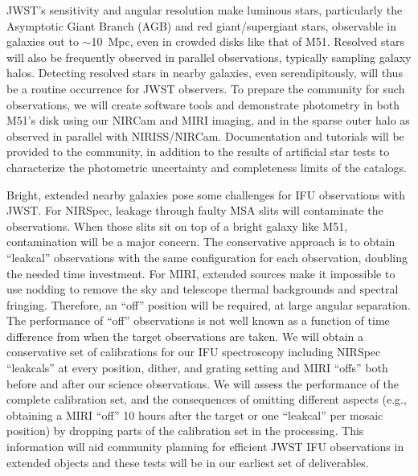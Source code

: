 \documentclass[12pt]{article}
\begin{document}
\vspace{0.05in} 

 JWST's sensitivity and angular resolution make luminous stars, particularly the Asymptotic Giant Branch (AGB) and red giant/supergiant stars, observable in galaxies out to $\sim$10~Mpc, even in crowded disks like that of M51.  Resolved stars will also be frequently observed in parallel observations, typically sampling galaxy halos. Detecting resolved stars in nearby galaxies, even serendipitously, will thus be a routine occurrence for JWST observers.  To prepare the community for  such observations, we will create software tools and demonstrate photometry in both M51's disk using our NIRCam and MIRI imaging, and in the sparse outer halo as observed in parallel with NIRISS/NIRCam.  Documentation and tutorials will be provided to the community, in addition to the results of artificial star tests to characterize the photometric uncertainty and completeness limits of the catalogs.

\vspace{0.05in} 

 Bright, extended nearby galaxies pose some challenges for IFU observations with JWST. For NIRSpec, leakage through faulty MSA slits will contaminate the observations.  When those slits sit on top of a bright galaxy like M51, contamination will be a major concern.  The conservative approach is to obtain ``leakcal'' observations with the same configuration for each observation, doubling the needed time investment.  For MIRI, extended sources make it impossible to use nodding to remove the sky and telescope thermal backgrounds and spectral fringing.  Therefore, an ``off'' position will be required, at large angular separation. The performance of ``off'' observations is not well known as a function of time difference from when the target observations are taken.  We will obtain a conservative set of calibrations for our IFU spectroscopy including NIRSpec ``leakcals'' at every position, dither, and grating setting and MIRI ``offs'' both before and after our science observations. We will assess the performance of the complete calibration set, and the consequences of omitting different aspects (e.g., obtaining a MIRI ``off'' 10 hours after the target or one ``leakcal'' per mosaic position) by dropping parts of the calibration set in the processing. This information will aid community planning for efficient JWST IFU observations in extended objects and these tests will be in our earliest set of deliverables.
\end{document}
